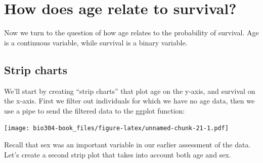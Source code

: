 \documentclass[]{book}
\newenvironment{Shaded}{\begin{snugshade}}{\end{snugshade}}
\newcommand{\CommentTok}[1]{\textcolor[rgb]{0.56,0.35,0.01}{\textit{#1}}}
\newcommand{\DataTypeTok}[1]{\textcolor[rgb]{0.13,0.29,0.53}{#1}}
\newcommand{\FloatTok}[1]{\textcolor[rgb]{0.00,0.00,0.81}{#1}}
\newcommand{\KeywordTok}[1]{\textcolor[rgb]{0.13,0.29,0.53}{\textbf{#1}}}
\newcommand{\NormalTok}[1]{#1}
\newcommand{\OperatorTok}[1]{\textcolor[rgb]{0.81,0.36,0.00}{\textbf{#1}}}
\newcommand{\StringTok}[1]{\textcolor[rgb]{0.31,0.60,0.02}{#1}}
\theoremstyle{definition}
\theoremstyle{definition}
\theoremstyle{definition}
\theoremstyle{remark}
\begin{document}
\begin{Shaded}
\end{Shaded}

\hypertarget{how-does-age-relate-to-survival}{%
\section{How does age relate to
survival?}\label{how-does-age-relate-to-survival}}

Now we turn to the question of how age relates to the probability of
survival. Age is a continuous variable, while survival is a binary
variable.

\hypertarget{strip-charts}{%
\subsection{Strip charts}\label{strip-charts}}

We'll start by creating ``strip charts'' that plot age on the y-axis,
and survival on the x-axis. First we filter out individuals for which we
have no age data, then we use a pipe to send the filtered data to the
ggplot function:

\begin{Shaded}
\end{Shaded}

\texttt{[image: bio304-book\_files/figure-latex/unnamed-chunk-21-1.pdf]}

Recall that sex was an important variable in our earlier assessment of
the data. Let's create a second strip plot that takes into account both
age and sex.
\end{document}
